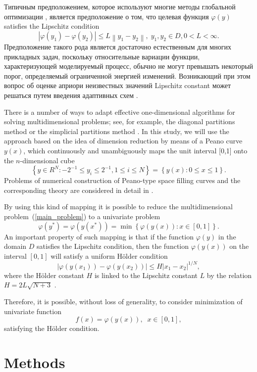 \documentclass[sensors,article,submit,moreauthors,pdftex]{Definitions/mdpi}
\begin{document}
Типичным предположением, которое используют многие методы глобальной оптимизации \cite{Sergeyev2013,Evtushenko2013,Jones2009,Zilinskas2010}, является предположение о том, что целевая функция $\varphi(y)$ satisfies the Lipschitz condition
\[
\left|\varphi(y_1)-\varphi(y_2)\right|\leq L\left\|y_1-y_2\right\|,\; y_1,y_2 \in D, 0<L<\infty.
\]
Предположение такого рода является достаточно естественным для многих прикладных задач, поскольку относительные вариации функции, характеризующей моделируемый процесс, обычно не могут превышать некоторый порог, определяемый ограниченной энергией изменений. Возникающий при этом вопрос об оценке априори неизвестных значений Lipschitz constant может решаться путем введения адаптивных схем \cite{Strongin2020,Strongin2020_1}.

There is a number of ways to adapt effective one-dimensional algorithms for solving multidimensional problems; see, for example, the diagonal partitions method \cite{Sergeyev2017} or the simplicial partitions method \cite{Zilinskas2014}. In this study, we will use the approach based on the idea of dimension reduction by means of a Peano curve $y(x)$, which continuously and unambiguously maps the unit interval [0,1] onto the $n$-dimensional cube
\[
\left\{y\in R^N: -2^{-1}\leq y_i \leq 2^{-1}, 1 \leq i \leq N\right\}=\left\{y(x):0\leq x \leq 1 \right\}.
\]
Problems of numerical construction of Peano-type space filling curves and the corresponding theory are considered in detail in \cite{Strongin2000,Sergeyev2013}.

By using this kind of mapping it is possible to reduce the multidimensional problem~(\ref{main_problem}) to a univariate problem
\[
\varphi(y^\ast)=\varphi(y(x^\ast))=\min{\left\{\varphi(y(x)): x\in[0,1]\right\}}.
\]
An important property of such mapping is that if the function $\varphi(y)$ in the domain $D$ satisfies the Lipschitz condition, then the function $\varphi(y(x))$ on the interval $[0,1]$ will satisfy a uniform H{\"o}lder condition
\[
\left|\varphi(y(x_1))-\varphi(y(x_2))\right|\leq H\left|x_1-x_2\right|^{1/N},
\]
where the H{\"o}lder constant $H$ is linked to the Lipschitz constant $L$ by the relation $H=2L\sqrt{N+3}$ \cite{Strongin2000}.

Therefore, it is possible, without loss of generality, to consider minimization of univariate function
\[
f(x)=\varphi(y(x)), \;\; x\in[0,1],
\]
satisfying the H{\"o}lder condition.

 
\section{Methods}
\end{document}
